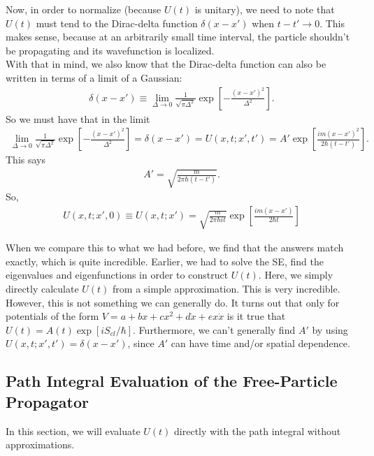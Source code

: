 \documentclass{book}
\theoremstyle{definition}
\newcommand{\f}[2]{\frac{#1}{#2}}
\newcommand{\lb}{\left[}
\newcommand{\rb}{\right]}
\begin{document}
Now, in order to normalize (because $U(t)$ is unitary), we need to note that $U(t)$ must tend to the Dirac-delta function $\delta(x - x')$ when $t - t' \to 0$. This makes sense, because at an arbitrarily small time interval, the particle shouldn't be propagating and its wavefunction is localized. \\

With that in mind, we also know that the Dirac-delta function can also be written in terms of a limit of a Gaussian:
\begin{align}
\delta(x - x') \equiv \lim_{\Delta \to 0} \f{1}{\sqrt{\pi \Delta^2}} \exp\lb -\f{(x-x')^2}{\Delta^2} \rb.
\end{align}
So we must have that in the limit
\begin{align}
\lim_{\Delta \to 0} \f{1}{\sqrt{\pi \Delta^2}} \exp\lb -\f{(x-x')^2}{\Delta^2} \rb = \delta(x-x') = U(x,t;x',t') = A' \exp\lb \f{im(x-x')^2}{2\hbar(t-t')} \rb.
\end{align}
This says
\begin{align}
A' = \sqrt{\f{m}{2\pi \hbar(t-t')}}.
\end{align}
So,
\begin{align}
\boxed{U(x,t; x',0) \equiv U(x,t;x') = \sqrt{\f{m}{2\pi\hbar it}}\exp\lb \f{im(x-x')}{2\hbar t} \rb}
\end{align}

When we compare this to what we had before, we find that the answers match exactly, which is quite incredible. Earlier, we had to solve the SE, find the eigenvalues and eigenfunctions in order to construct $U(t)$. Here, we simply directly calculate $U(t)$ from a simple approximation. This is very incredible.\\

However, this is not something we can generally do. It turns out that only for potentials of the form $V = a + bx + cx^2 + d\dot{x} + ex\dot{x}$ is it true that $U(t) = A(t)\exp[iS_{cl}/\hbar]$. Furthermore, we can't generally find $A'$ by using $U(x,t;x',t') = \delta(x-x')$, since $A'$ can have time and/or spatial dependence. 




\subsection{Path Integral Evaluation of the Free-Particle Propagator}


In this section, we will evaluate $U(t)$ directly with the path integral without approximations. \\
\end{document}

